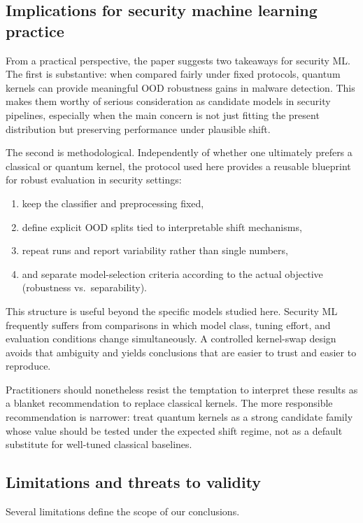 \documentclass[pdflatex,sn-mathphys-num]{sn-jnl}%
\theoremstyle{thmstyleone}%
\theoremstyle{thmstyletwo}%
\theoremstyle{thmstylethree}%
\begin{document}
\subsection{Implications for security machine learning practice}

From a practical perspective, the paper suggests two takeaways for security ML. The first is substantive: when compared fairly under fixed protocols, quantum kernels can provide meaningful OOD robustness gains in malware detection. This makes them worthy of serious consideration as candidate models in security pipelines, especially when the main concern is not just fitting the present distribution but preserving performance under plausible shift.

The second is methodological. Independently of whether one ultimately prefers a classical or quantum kernel, the protocol used here provides a reusable blueprint for robust evaluation in security settings:
\begin{enumerate}
    \item keep the classifier and preprocessing fixed,
    \item define explicit OOD splits tied to interpretable shift mechanisms,
    \item repeat runs and report variability rather than single numbers,
    \item and separate model-selection criteria according to the actual objective (robustness vs.\ separability).
\end{enumerate}
This structure is useful beyond the specific models studied here. Security ML frequently suffers from comparisons in which model class, tuning effort, and evaluation conditions change simultaneously. A controlled kernel-swap design avoids that ambiguity and yields conclusions that are easier to trust and easier to reproduce.

Practitioners should nonetheless resist the temptation to interpret these results as a blanket recommendation to replace classical kernels. The more responsible recommendation is narrower: treat quantum kernels as a strong candidate family whose value should be tested under the expected shift regime, not as a default substitute for well-tuned classical baselines.

\subsection{Limitations and threats to validity}

Several limitations define the scope of our conclusions.
\end{document}
